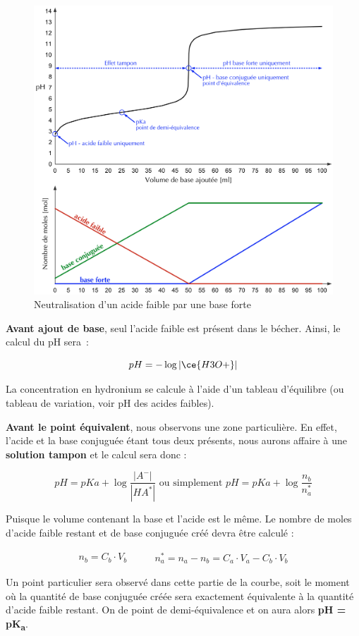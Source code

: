 \documentclass[
  11pt,
  french,
  a4paper,
  openany]{book}
\begin{document}
\begin{figure}

{\centering \includegraphics[width=0.65\linewidth]{images/courbes-titration-acide-faible} 

}

\caption{Neutralisation d'un acide faible par une base forte}\label{fig:acides-bases-6c}
\end{figure}

\textbf{Avant ajout de base}, seul l'acide faible est présent dans le bécher. Ainsi, le calcul du pH sera~:

\[
pH = - \log |\ce{H3O+}|
\]

La concentration en hydronium se calcule à l'aide d'un tableau d'équilibre (ou tableau de variation, voir pH des acides faibles).

\textbf{Avant le point équivalent}, nous observons une zone particulière. En effet, l'acide et la base conjuguée étant tous deux présents, nous aurons affaire à une \textbf{solution tampon} et le calcul sera donc :

\[
pH = pKa + \log \frac{|A^-|}{|HA^*|} \text{ ou simplement } pH = pKa + \log{\frac{n_b}{n_a^*}}
\]

Puisque le volume contenant la base et l'acide est le même. Le nombre de moles d'acide faible restant et de base conjuguée créé devra être calculé :

\[
\begin{split}
n_b = C_b \cdot V_b
\end{split}
\qquad
\begin{split}
n_a^* = n_a - n_b = C_a \cdot V_a - C_b \cdot V_b
\end{split}
\]

Un point particulier sera observé dans cette partie de la courbe, soit le moment où la quantité de base conjuguée créée sera exactement équivalente à la quantité d'acide faible restant. On de point de demi-équivalence et on aura alors \textbf{pH = pK\textsubscript{a}}.
\end{document}
